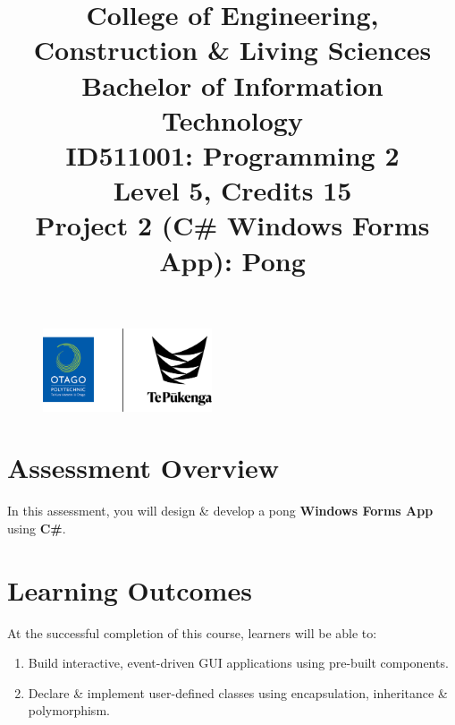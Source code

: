 \documentclass{article}
\author{}
\begin{document}
\begin{figure}
    \centering
    \includegraphics[width=50mm]{../../resources/img/logo.png}
\end{figure}

\title{College of Engineering, Construction \& Living Sciences\\Bachelor of Information Technology\\ID511001: Programming 2\\Level 5, Credits 15\\\textbf{Project 2 (C\# Windows Forms App): Pong}}
\date{}
\maketitle 

\section*{Assessment Overview}
In this assessment, you will design \& develop a pong \textbf{Windows Forms App} using \textbf{C\#}.

\section*{Learning Outcomes}
At the successful completion of this course, learners will be able to:
\begin{enumerate}
    \item Build interactive, event-driven GUI applications using pre-built components.
    \item Declare \& implement user-defined classes using encapsulation, inheritance \& polymorphism.
\end{enumerate}
\end{document}
